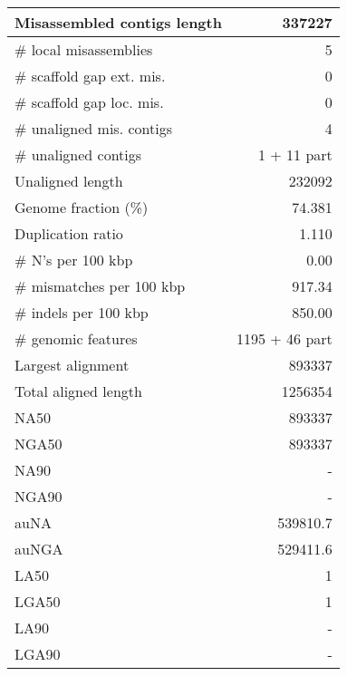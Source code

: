 \documentclass[12pt,a4paper]{article}
\begin{document}
\begin{table}[ht]
\begin{center}
\begin{tabular}{|l*{1}{|r}|}
Misassembled contigs length & 337227 \\ \hline
\# local misassemblies & 5 \\ \hline
\# scaffold gap ext. mis. & 0 \\ \hline
\# scaffold gap loc. mis. & 0 \\ \hline
\# unaligned mis. contigs & 4 \\ \hline
\# unaligned contigs & 1 + 11 part \\ \hline
Unaligned length & 232092 \\ \hline
Genome fraction (\%) & 74.381 \\ \hline
Duplication ratio & 1.110 \\ \hline
\# N's per 100 kbp & 0.00 \\ \hline
\# mismatches per 100 kbp & 917.34 \\ \hline
\# indels per 100 kbp & 850.00 \\ \hline
\# genomic features & 1195 + 46 part \\ \hline
Largest alignment & 893337 \\ \hline
Total aligned length & 1256354 \\ \hline
NA50 & 893337 \\ \hline
NGA50 & 893337 \\ \hline
NA90 & - \\ \hline
NGA90 & - \\ \hline
auNA & 539810.7 \\ \hline
auNGA & 529411.6 \\ \hline
LA50 & 1 \\ \hline
LGA50 & 1 \\ \hline
LA90 & - \\ \hline
LGA90 & - \\ \hline
\end{tabular}
\end{center}
\end{table}
\end{document}
